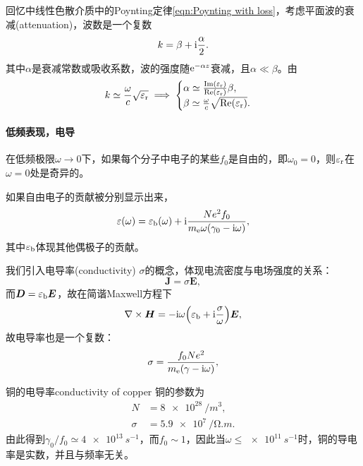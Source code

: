 回忆中线性色散介质中的Poynting定律\eqref{eqn:Poynting with loss}，考虑平面波的衰减(attenuation)，波数是一个复数
\[
    k=\beta+\mathrm{i}\frac\alpha 2.
\]
其中$\alpha$是衰减常数或吸收系数，波的强度随$\mathop{}\!\mathrm{e}^{-\alpha z}$衰减，且$\alpha\ll\beta$。由
\[
    k\simeq\frac\omega c\sqrt{\varepsilon_\text r}\implies
    \begin{cases}
        \alpha\simeq\frac{\operatorname{Im}(\varepsilon_\text r)}{\operatorname{Re}(\varepsilon_\text r)}\beta,\\
        \beta\simeq\frac\omega c\sqrt{\operatorname{Re}(\varepsilon_\text r)}.
    \end{cases}
\]
\paragraph{低频表现，电导}
在低频极限$\omega\to0$下，如果每个分子中电子的某些$f_0$是自由的，即$\omega_0=0$，则$\varepsilon_\text r$在$\omega=0$处是奇异的。

如果自由电子的贡献被分别显示出来，
\[
    \varepsilon(\omega)=\varepsilon_\text b(\omega)+\mathrm{i}\frac{Ne^2f_0}{m_\mathrm e\omega(\gamma_0-\mathrm{i}\omega)},
\]
其中$\varepsilon_\text b$体现其他偶极子的贡献。

我们引入电导率(conductivity) $\sigma$的概念，体现电流密度与电场强度的关系：
\[
    \bm J=\sigma\bm E,
\]
而$\bm D=\varepsilon_\text b\bm E$，故在简谐Maxwell方程下
\[
    \nabla\times\bm H=-\mathrm{i}\omega\Bigl(\varepsilon_\text b+\mathrm{i}\frac\sigma\omega\Bigr)\bm E,
\]
故电导率也是一个复数：
\begin{equation}
    \sigma=\frac{f_0Ne^2}{m_\mathrm e(\gamma-\mathrm{i}\omega)},
\end{equation} 
\begin{example}{铜的电导率}{conductivity of copper}
    铜的参数为
    \begin{align*}
        N&=\SI{8e28}{/m^3},\\
        \sigma&=\SI{5.9e7}{/\ohm.m}.
    \end{align*}
    由此得到$\gamma_0/f_0\simeq\SI{4e13}{s^{-1}}$，而$f_0\sim 1$，因此当$\omega\leqslant\SI{e11}{s^{-1}}$时，铜的导电率是实数，并且与频率无关。
\end{example}
